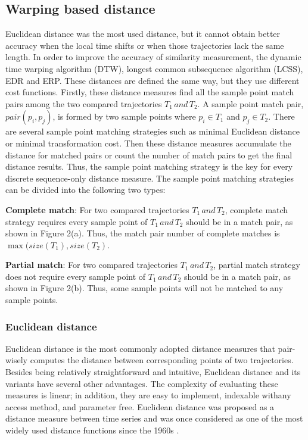 \documentclass[a4paper, 12pt]{article}
\begin{document}
\subsection{Warping based distance}
Euclidean distance was the most used distance, but it cannot obtain better accuracy when the local time shifts or when those trajectories lack the same length. In order to improve the accuracy of similarity measurement, the dynamic time warping algorithm (DTW), longest common subsequence algorithm (LCSS), EDR and ERP. These distances are defined the same way, but they use different cost functions. Firstly, these distance measures find all the sample point match pairs among the two compared trajectories $T_{1}\,and\,T_{2}$. A sample point match pair, $pair(p_{i},p_{j})$, is formed by two sample points where $p_{i} \in T_{1}$ and $p_{j} \in T_{2}$. There are several sample point matching strategies such as minimal Euclidean distance or minimal transformation cost. Then these distance measures accumulate the distance for matched pairs or count the number of match pairs to get the final distance results. Thus, the sample point matching strategy is the key for every discrete sequence-only distance measure. The sample point matching strategies can be divided into the following two types:

\textbf{Complete match}: For two compared trajectories $T_{1}\,and\,T_{2}$, complete match strategy requires every sample point of $T_{1}\,and\,T_{2}$ should be in a match pair, as shown in Figure 2(a). Thus, the match pair number of complete matches is $\max(size(T_{1}),size(T_{2})$.

\textbf{Partial match}: For two compared trajectories $T_{1}\,and\,T_{2}$, partial match strategy does not require every sample point of $T_{1}\,and\,T_{2}$ should be in a match pair, as shown in Figure 2(b). Thus, some sample points will not be matched to any sample points.

\subsubsection{Euclidean distance}
Euclidean distance is the most commonly adopted distance measures that pair-wisely computes the distance between corresponding points of two trajectories. Besides being relatively straightforward and intuitive, Euclidean distance and its variants have several other advantages. The complexity of evaluating these measures is linear; in addition, they are easy to implement, indexable withany access method, and parameter free. Euclidean distance was proposed as a distance measure between time series and was once considered as one of the most widely used distance functions since the 1960s \citep{keogh2000scaling,faloutsos1994fast,pfeifer1980three,priestley1980state}.
\end{document}
